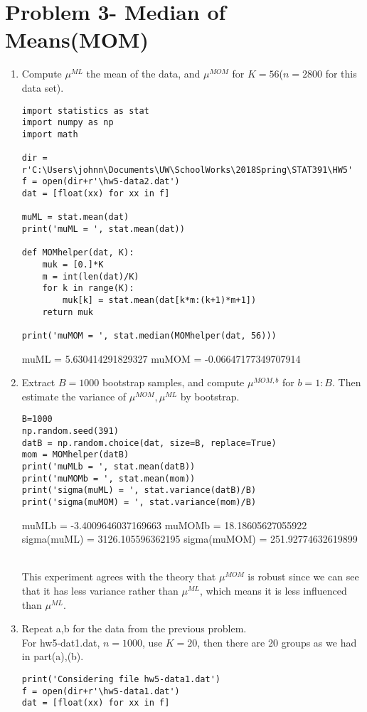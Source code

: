 \documentclass[preprint,12pt]{elsarticle}
\begin{document}
    \section{Problem 3- Median of Means(MOM)}
    \begin{enumerate}[label=\alph*]
        \item Compute $\mu^{ML}$ the mean of the data, and $\mu^{MOM}$ for 
        $K=56$($n=2800$ for this data set).
        \begin{lstlisting}
import statistics as stat
import numpy as np
import math

dir = r'C:\Users\johnn\Documents\UW\SchoolWorks\2018Spring\STAT391\HW5'
f = open(dir+r'\hw5-data2.dat')
dat = [float(xx) for xx in f]

muML = stat.mean(dat)
print('muML = ', stat.mean(dat))

def MOMhelper(dat, K):
    muk = [0.]*K
    m = int(len(dat)/K)
    for k in range(K):
        muk[k] = stat.mean(dat[k*m:(k+1)*m+1])
    return muk

print('muMOM = ', stat.median(MOMhelper(dat, 56)))
        \end{lstlisting}
        \begin{spverbatim}
muML =  5.630414291829327
muMOM =  -0.06647177349707914
        \end{spverbatim}

        \item Extract $B=1000$ bootstrap samples, and compute $\mu^{MOM,b}$ 
        for $b=1:B$. Then estimate the variance of $\mu^{MOM},\mu^{ML}$ by 
        bootstrap.
        \begin{lstlisting}
B=1000
np.random.seed(391)
datB = np.random.choice(dat, size=B, replace=True)
mom = MOMhelper(datB)
print('muMLb = ', stat.mean(datB))
print('muMOMb = ', stat.mean(mom))
print('sigma(muML) = ', stat.variance(datB)/B)
print('sigma(muMOM) = ', stat.variance(mom)/B)
        \end{lstlisting}
        \begin{spverbatim}
muMLb =  -3.4009646037169663
muMOMb =  18.18605627055922
sigma(muML) =  3126.105596362195
sigma(muMOM) =  251.92774632619899
        \end{spverbatim}
        \\ This experiment agrees with the theory that $\mu^{MOM}$ is robust
        since we can see that it has less variance rather than $\mu^{ML}$, which
        means it is less influenced than $\mu^{ML}$.
        
        \item Repeat a,b for the data from the previous problem.
        \\ For hw5-dat1.dat, $n=1000$, use $K=20$, then there are 20 groups
        as we had in part(a),(b).
        \begin{lstlisting}
print('Considering file hw5-data1.dat')
f = open(dir+r'\hw5-data1.dat')
dat = [float(xx) for xx in f]


\end{lstlisting}
\end{enumerate}
\end{document}
